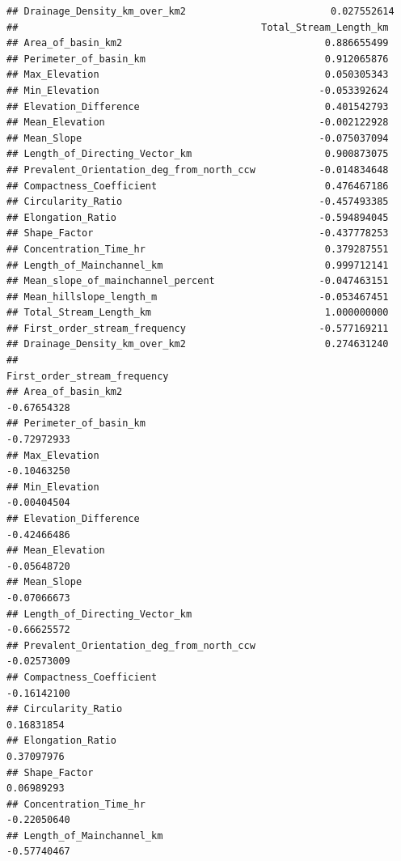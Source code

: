 \documentclass[11pt,]{article}
\begin{document}
\begin{verbatim}
## Drainage_Density_km_over_km2                         0.027552614
##                                          Total_Stream_Length_km
## Area_of_basin_km2                                   0.886655499
## Perimeter_of_basin_km                               0.912065876
## Max_Elevation                                       0.050305343
## Min_Elevation                                      -0.053392624
## Elevation_Difference                                0.401542793
## Mean_Elevation                                     -0.002122928
## Mean_Slope                                         -0.075037094
## Length_of_Directing_Vector_km                       0.900873075
## Prevalent_Orientation_deg_from_north_ccw           -0.014834648
## Compactness_Coefficient                             0.476467186
## Circularity_Ratio                                  -0.457493385
## Elongation_Ratio                                   -0.594894045
## Shape_Factor                                       -0.437778253
## Concentration_Time_hr                               0.379287551
## Length_of_Mainchannel_km                            0.999712141
## Mean_slope_of_mainchannel_percent                  -0.047463151
## Mean_hillslope_length_m                            -0.053467451
## Total_Stream_Length_km                              1.000000000
## First_order_stream_frequency                       -0.577169211
## Drainage_Density_km_over_km2                        0.274631240
##                                          First_order_stream_frequency
## Area_of_basin_km2                                         -0.67654328
## Perimeter_of_basin_km                                     -0.72972933
## Max_Elevation                                             -0.10463250
## Min_Elevation                                             -0.00404504
## Elevation_Difference                                      -0.42466486
## Mean_Elevation                                            -0.05648720
## Mean_Slope                                                -0.07066673
## Length_of_Directing_Vector_km                             -0.66625572
## Prevalent_Orientation_deg_from_north_ccw                  -0.02573009
## Compactness_Coefficient                                   -0.16142100
## Circularity_Ratio                                          0.16831854
## Elongation_Ratio                                           0.37097976
## Shape_Factor                                               0.06989293
## Concentration_Time_hr                                     -0.22050640
## Length_of_Mainchannel_km                                  -0.57740467

\end{verbatim}
\end{document}
